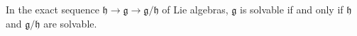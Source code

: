 In the exact sequence $\mathfrak{h} \rightarrow \mathfrak{g} \rightarrow \mathfrak{g}/\mathfrak{h}$ of Lie algebras, $\mathfrak{g}$ is solvable if and only if $\mathfrak{h}$ and $\mathfrak{g}/\mathfrak{h}$ are solvable.
